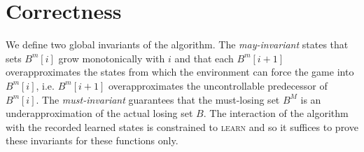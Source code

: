 \section{Correctness}


We define two global invariants of the algorithm.  The \emph{may-invariant}
states that sets $B^m[i]$ grow monotonically with $i$ and that each $B^m[i+1]$
overapproximates the states from which the environment can force the game into
$B^m[i]$, i.e. $B^m[i+1]$ overapproximates the uncontrollable predecessor of $B^m[i]$.  The \emph{must-invariant} guarantees that the must-losing set $B^M$ is an underapproximation of the actual losing set $B$. The interaction of the algorithm with the recorded learned states is constrained to \textsc{learn} and  so it suffices to prove these invariants for these functions only.

